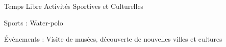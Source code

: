 \begin{cventries}

	\cventry
	{Temps Libre} %
	{Activités Sportives et Culturelles} %
	{} %
	{} %
	{
		\begin{cvitems} %
            \item {Sports : Water-polo}
            \item {Événements : Visite de musées, découverte de nouvelles villes et cultures}
		\end{cvitems}
	}
    {}
\end{cventries}

